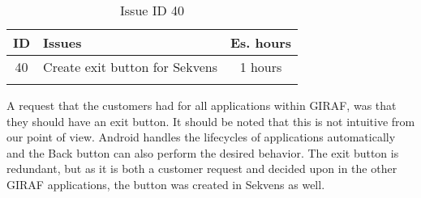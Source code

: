 \clearpage
\begin{longtable} { | c | p{12cm} | c | } 
\hline
	ID 	&	Issues	&		 Es. hours \\\hline
	40	&	Create exit button for Sekvens	&	1 hours \\\hline
\caption{Issue ID 40}
\label{tab:spr3_createexitbutton}
\end{longtable}

A request that the customers had for all applications within GIRAF, was that they should have an exit button. It should be noted that this is not intuitive from our point of view. Android handles the lifecycles of applications automatically\cite{Lifecycle} and the Back button can also perform the desired behavior. The exit button is redundant, but as it is both a customer request and decided upon in the other GIRAF applications, the button was created in Sekvens as well.
